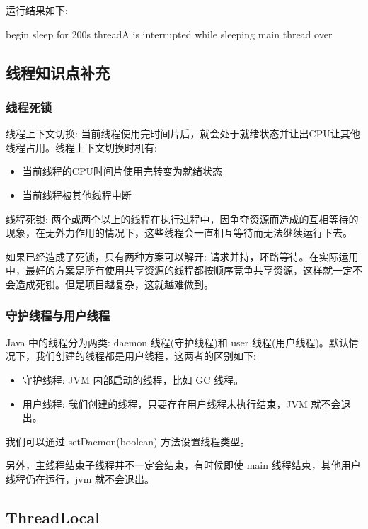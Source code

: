 运行结果如下:

\begin{Java}
begin sleep for 200s
threadA is interrupted while sleeping
main thread over
\end{Java}

\subsection{线程知识点补充}

\subsubsection*{线程死锁}

线程上下文切换: 当前线程使用完时间片后，就会处于就绪状态并让出CPU让其他线程占用。线程上下文切换时机有:
\begin{itemize}
    \item 当前线程的CPU时间片使用完转变为就绪状态
    \item 当前线程被其他线程中断
\end{itemize}

线程死锁: 两个或两个以上的线程在执行过程中，因争夺资源而造成的互相等待的现象，在无外力作用的情况下，这些线程会一直相互等待而无法继续运行下去。

如果已经造成了死锁，只有两种方案可以解开: 请求并持，环路等待。在实际运用中，最好的方案是所有使用共享资源的线程都按顺序竞争共享资源，这样就一定不会造成死锁。但是项目越复杂，这就越难做到。

\subsubsection*{守护线程与用户线程}

Java 中的线程分为两类: daemon 线程(守护线程)和 user 线程(用户线程)。默认情况下，我们创建的线程都是用户线程，这两者的区别如下:
\begin{itemize}
    \item 守护线程: JVM 内部启动的线程，比如 GC 线程。
    \item 用户线程: 我们创建的线程，只要存在用户线程未执行结束，JVM 就不会退出。
\end{itemize}

我们可以通过 setDaemon(boolean) 方法设置线程类型。

另外，主线程结束子线程并不一定会结束，有时候即使 main 线程结束，其他用户线程仍在运行，jvm 就不会退出。

\subsection{ThreadLocal}


